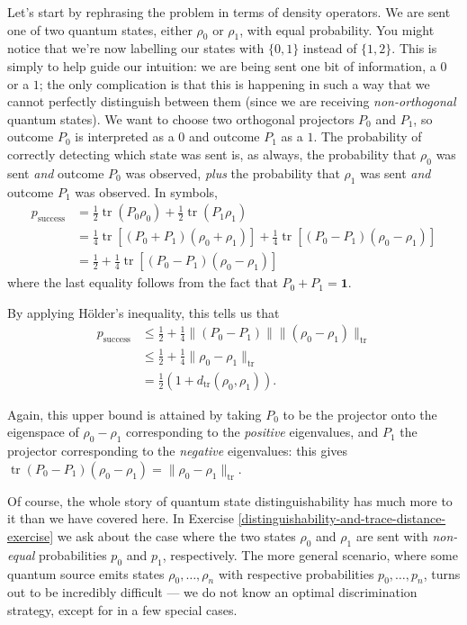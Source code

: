 \documentclass[fleqn,a4paper]{article}
\renewcommand{\footnote}[1]{\sidenotetext[{\color{white}0}\!\!]{\footnotesize #1}}
\theoremstyle{definition}
\theoremstyle{definition}
\theoremstyle{definition}
\theoremstyle{definition}
\theoremstyle{remark}
\begin{document}
Let's start by rephrasing the problem in terms of density operators.
We are sent one of two quantum states, either \(\rho_0\) or \(\rho_1\), with equal probability.
You might notice that we're now labelling our states with \(\{0,1\}\) instead of \(\{1,2\}\).
This is simply to help guide our intuition: we are being sent one bit of information, a \(0\) or a \(1\); the only complication is that this is happening in such a way that we cannot perfectly distinguish between them (since we are receiving \emph{non-orthogonal} quantum states).
We want to choose two orthogonal projectors \(P_0\) and \(P_1\), so outcome \(P_0\) is interpreted as a \(0\) and outcome \(P_1\) as a \(1\).
The probability of correctly detecting which state was sent is, as always, the probability that \(\rho_0\) was sent \emph{and} outcome \(P_0\) was observed, \emph{plus} the probability that \(\rho_1\) was sent \emph{and} outcome \(P_1\) was observed.
In symbols,
\[
  \begin{aligned}
    p_{\mathrm{success}}
    &= \frac{1}{2}\operatorname{tr}(P_0\rho_0) + \frac{1}{2}\operatorname{tr}(P_1\rho_1)
  \\&= \frac{1}{4}\operatorname{tr}[(P_0+P_1)(\rho_0+\rho_1)] + \frac{1}{4}\operatorname{tr}[(P_0-P_1)(\rho_0-\rho_1)]
  \\&= \frac{1}{2} + \frac{1}{4}\operatorname{tr}[(P_0-P_1)(\rho_0-\rho_1)]
  \end{aligned}
\]
where the last equality follows from the fact that \(P_0+P_1=\mathbf{1}\).

By applying Hölder's inequality\footnote{See Section \ref{more-operator-norms}.}, this tells us that
\[
  \begin{aligned}
    p_{\mathrm{success}}
    &\leqslant\frac{1}{2} + \frac{1}{4}\|(P_0-P_1)\|\|(\rho_0-\rho_1)\|_{\operatorname{tr}}
  \\&\leqslant\frac{1}{2} + \frac{1}{4}\|\rho_0-\rho_1\|_{\operatorname{tr}}
  \\&= \frac{1}{2}(1+d_{\operatorname{tr}}(\rho_0,\rho_1)).
  \end{aligned}
\]

Again, this upper bound is attained by taking \(P_0\) to be the projector onto the eigenspace of \(\rho_0-\rho_1\) corresponding to the \emph{positive} eigenvalues, and \(P_1\) the projector corresponding to the \emph{negative} eigenvalues: this gives \(\operatorname{tr}(P_0-P_1)(\rho_0-\rho_1)=\|\rho_0-\rho_1\|_{\operatorname{tr}}\).

Of course, the whole story of quantum state distinguishability has much more to it than we have covered here.
In Exercise \ref{distinguishability-and-trace-distance-exercise} we ask about the case where the two states \(\rho_0\) and \(\rho_1\) are sent with \emph{non-equal} probabilities \(p_0\) and \(p_1\), respectively.
The more general scenario, where some quantum source emits states \(\rho_0,\ldots,\rho_n\) with respective probabilities \(p_0,\ldots,p_n\), turns out to be incredibly difficult --- we do not know an optimal discrimination strategy, except for in a few special cases.
\end{document}

